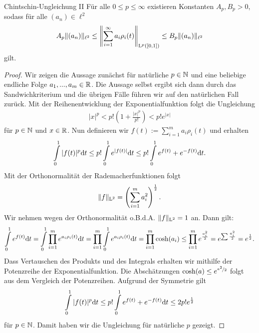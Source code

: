 \begin{genericthm}{Chintschin-Ungleichung II}\label{th:khinchin_inequality_3}
	Für alle $ 0 \leq p \leq \infty $ existieren Konstanten $ A_p, B_p > 0 $, sodass für alle $ (a_n) \in \ell^2 $
	\begin{align*}
		A_p \|(a_n) \|_{\ell^2} \leq 
		\left\|
		\sum_{i=1}^\infty a_i \rho_i(t)
		\right\|_{\mathrm{L}^p([0,1])}
		\leq
		B_p \|(a_n) \|_{\ell^2}
	\end{align*}
	gilt.
\end{genericthm}

\begin{proof}
	Wir zeigen die Aussage zunächst für natürliche $ p \in \mathbb{N} $ und
	eine beliebige endliche Folge $ a_1,...,a_m \in \mathbb{R} $.
	Die Aussage selbst ergibt sich dann durch das Sandwichkriterium und die übrigen Fälle führen wir auf den natürlichen Fall zurück.
	Mit der Reihenentwicklung der Exponentialfunktion folgt die Ungleichung
	\begin{align*}
		|x|^p 
		< 
		p!\left(1 + \frac{|x|^p}{p!}\right)
		<
		p! e^{|x|}
	\end{align*}
	für $ p \in \mathbb{N} $ und $ x \in\mathbb{R} $.
	Nun definieren wir $ f(t) := \sum_{i=1}^m a_i \rho_i(t) $ und erhalten
	\begin{align*}
		\int \limits_0^1
		|f(t) |^p
		\mathrm{d}t
		\leq 
		p!
		\int \limits_0^1
		e^{|f(t)|}
		\mathrm{d}t
		\leq 
		p!
		\int \limits_0^1
		e^{f(t)} + e^{-f(t)}
		\mathrm{d}t.
	\end{align*}
	Mit der Orthonormalität der Rademacherfunktionen folgt
	\begin{align*}
		\| f \|_{\mathrm{L}^2} = \left(\sum \limits_{i=1}^m a_i^2\right)^\frac{1}{2}.
	\end{align*}
	\newpage
	Wir nehmen wegen der Orthonormalität o.B.d.A. $ \|f \|_{\mathrm{L}^2} = 1$ an.
	Dann gilt:
	\begin{align*}
		\int \limits_{0}^1 e^{f(t)} \mathrm{d}t 
		=
		\int \limits_{0}^1 
		\prod \limits_{i=1}^m e^{a_i \rho_i(t)} \mathrm{d}t 
		=
		\prod \limits_{i=1}^m
		\int \limits_{0}^1 
		 e^{a_i \rho_i(t)} \mathrm{d}t
		=
		\prod \limits_{i=1}^m
		\cosh(a_i)
		\leq 
		\prod \limits_{i=1}^m
		e^{\frac{a_i^2}{2}}
		=
		e^{\sum \frac{a_i^2}{2}}
		=
		e^\frac{1}{2}.
	\end{align*}
	Dass Vertauschen des Produkts und des Integrals erhalten wir mithilfe der Potenzreihe der Exponentialfunktion.
	Die Abschätzungen $ \cosh(a) \leq e^{\nicefrac{a^2}{2}} $ folgt aus dem Vergleich der Potenzreihen.
	Aufgrund der Symmetrie gilt
	\begin{align*}
		\int \limits_0^1
		|f(t) |^p
		\mathrm{d}t
		\leq 
		p!
		\int \limits_0^1
		e^{f(t)} + e^{-f(t)}
		\mathrm{d}t
		\leq 
		2 p! e^\frac{1}{2}
	\end{align*}
	für $ p \in \mathbb{N} $.
	Damit haben wir die Ungleichung für natürliche $ p $ gezeigt.
	

\end{proof}
